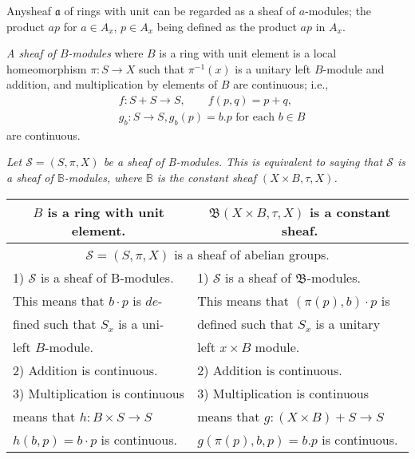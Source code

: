 Any\pageoriginale sheaf $\mathfrak{a}$ of rings with unit can be
regarded as a sheaf of 
$a$-modules; the product $ap$ for $a \in A_x$, $p \in A_x$ being defined
as the product $ap$ in $A_x$. 

\textit{A sheaf of $B$-modules} where $B$ is a ring with unit element is
a local homeomorphism $\pi : S \to X$ such that $\pi^{-1}(x)$ is a
unitary left $B$-module and addition, and multiplication by elements of
$B$ are continuous; i.e., 
\begin{align*}
& f:S+S \to S, \qquad f(p,q)=p+q,\\
& g_b:S \to 	S, g_b (p)=b.p \text{ for each } b \in B
\end{align*}
are continuous.

\textit{Let $\mathscr{S}=(S, \pi , X)$ be a sheaf of B-modules. This
  is equivalent to saying that $\mathscr{S}$ is a sheaf of
  $\mathbb{B}$-modules, where $\mathbb{B}$ is the constant sheaf $(X
  \times B, \tau, X)$.} 

\medskip
{}

\noindent
\begin{tabular}[t]{ll}
\hline
\multicolumn{1}{c|}{$B$ is a ring with unit element.} &
\multicolumn{1}{c}{$\mathfrak{B}(X \times B, \tau, X)$ is a constant
  sheaf.} \\ 
\hline
\multicolumn{2}{c}{$\mathscr{S}=(S,\pi,X)$ is a sheaf of abelian
  groups.} \\ 
1) $\mathscr{S}$ is a sheaf of B-modules. & 1) $\mathscr{S}$ is a
sheaf of $\mathfrak{B}$-modules.\\ 
This means that $b \cdot p$ is $de$- & This means that $(\pi(p),b)
\cdot p$ is \\   
fined such that $S_x$ is a uni-& defined such that $S_x$ is a unitary \\
  left $B$-module. & left $x \times B$ module.\\
2) Addition is continuous. & 2) Addition is continuous.\\
3) Multiplication is continuous & 3) Multiplication is continuous\\
means that $h:B \times S \to S$ & means that $g: (X \times B)+ S \to S$\\
$h(b,p)=b \cdot p$ is continuous. & $g(\pi(p),b,p)=b.p$ is continuous.\\
\hline
\end{tabular}


